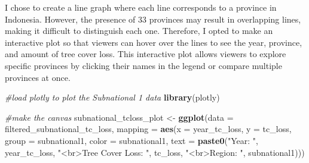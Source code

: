 \documentclass[
]{article}
\newenvironment{Shaded}{\begin{snugshade}}{\end{snugshade}}
\newcommand{\AttributeTok}[1]{\textcolor[rgb]{0.13,0.29,0.53}{#1}}
\newcommand{\CommentTok}[1]{\textcolor[rgb]{0.56,0.35,0.01}{\textit{#1}}}
\newcommand{\FunctionTok}[1]{\textcolor[rgb]{0.13,0.29,0.53}{\textbf{#1}}}
\newcommand{\NormalTok}[1]{#1}
\newcommand{\OtherTok}[1]{\textcolor[rgb]{0.56,0.35,0.01}{#1}}
\newcommand{\StringTok}[1]{\textcolor[rgb]{0.31,0.60,0.02}{#1}}
\begin{document}
I chose to create a line graph where each line corresponds to a province
in Indonesia. However, the presence of 33 provinces may result in
overlapping lines, making it difficult to distinguish each one.
Therefore, I opted to make an interactive plot so that viewers can hover
over the lines to see the year, province, and amount of tree cover loss.
This interactive plot allows viewers to explore specific provinces by
clicking their names in the legend or compare multiple provinces at
once.

\begin{Shaded}
\begin{Highlighting}[]
\CommentTok{\#load plotly to plot the Subnational 1 data  }
\FunctionTok{library}\NormalTok{(plotly)}

\CommentTok{\#make the canvas}
\NormalTok{subnational\_tcloss\_plot }\OtherTok{\textless{}{-}} \FunctionTok{ggplot}\NormalTok{(}\AttributeTok{data =}\NormalTok{ filtered\_subnational\_tc\_loss, }\AttributeTok{mapping =}
         \FunctionTok{aes}\NormalTok{(}\AttributeTok{x =}\NormalTok{ year\_tc\_loss, }\AttributeTok{y =}\NormalTok{ tc\_loss, }\AttributeTok{group =} 
\NormalTok{               subnational1, }\AttributeTok{color =}\NormalTok{ subnational1, }\AttributeTok{text =} \FunctionTok{paste0}\NormalTok{(}\StringTok{"Year: "}\NormalTok{, year\_tc\_loss,}
              \StringTok{"\textless{}br\textgreater{}Tree Cover Loss: "}\NormalTok{, tc\_loss, }
              \StringTok{"\textless{}br\textgreater{}Region: "}\NormalTok{, subnational1)))  }


\end{Highlighting}
\end{Shaded}
\end{document}
